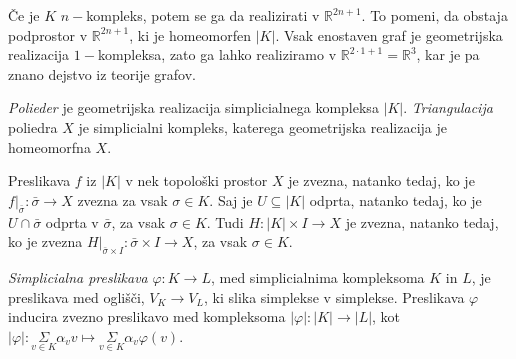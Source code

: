 \documentclass[mat1]{fmfdelo}
\DeclareRobustCommand{\si}{
    \bar{\sigma}}
\newcommand{\R}{\mathbb R}
\begin{document}
 \begin{opomba}
     Če je $K$ $n-$kompleks, potem se ga da realizirati v $\R^{2n+1}$. To pomeni, da obstaja podprostor v
     $\R^{2n+1}$, ki je homeomorfen $|K|$. Vsak enostaven graf je geometrijska realizacija $1-$kompleksa, zato ga 
     lahko realiziramo v $\R^{2\cdot 1 +1}=\R^{3}$, kar je pa znano dejstvo iz teorije grafov.
 \end{opomba}
 
 
 \textit{Polieder} je geometrijska realizacija simplicialnega kompleksa $|K|$. \textit{Triangulacija} poliedra $X$ je simplicialni kompleks, katerega geometrijska realizacija je homeomorfna $X$.
 
Preslikava $f$ iz $|K|$ v nek topološki prostor $X$ je zvezna, natanko tedaj, ko je $f|_{\bar{\sigma}}\colon  \bar{\sigma} \rightarrow X$ zvezna za vsak $\sigma\in K$.
Saj je $U \subseteq |K|$ odprta, natanko tedaj, ko je $U \cap 
\si$ odprta v $\si$, za vsak $\sigma \in K$.
Tudi $H\colon |K|\times I \rightarrow X$ je zvezna, natanko tedaj, ko je zvezna $H|_{\si\times I}\colon \si\times I \rightarrow X$, za vsak $\sigma\in K$.
 
 
 \textit{Simplicialna preslikava} $\varphi \colon K \rightarrow L$, med 
 simplicialnima kompleksoma $K$ in $L$, je preslikava med 
 oglišči, $V_K \rightarrow V_L$, ki slika simplekse v 
 simplekse. Preslikava $\varphi$ inducira zvezno preslikavo med 
 kompleksoma $|\varphi| \colon |K| \rightarrow |L|$, kot $|\varphi|\colon 
 \underset{v \in K}{\Sigma}\alpha_v v \mapsto
 \underset{v \in K}{\Sigma}\alpha_v \varphi(v)$.
 
     
 
 
 
\end{document}
